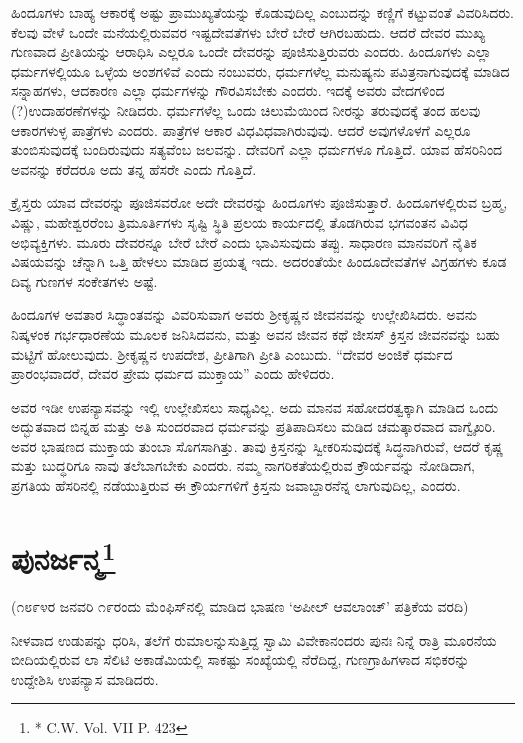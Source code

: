 ಹಿಂದೂಗಳು ಬಾಹ್ಯ ಆಕಾರಕ್ಕೆ ಅಷ್ಟು ಪ್ರಾಮುಖ್ಯತೆಯನ್ನು ಕೊಡುವುದಿಲ್ಲ ಎಂಬುದನ್ನು ಕಣ್ಣಿಗೆ ಕಟ್ಟುವಂತೆ ವಿವರಿಸಿದರು. ಕೆಲವು ವೇಳೆ ಒಂದೇ ಮನೆಯಲ್ಲಿರುವವರ ಇಷ್ಟದೇವತೆಗಳು ಬೇರೆ ಬೇರೆ ಆಗಿರಬಹುದು. ಆದರೆ ದೇವರ ಮುಖ್ಯ ಗುಣವಾದ ಪ್ರೀತಿಯನ್ನು ಆರಾಧಿಸಿ ಎಲ್ಲರೂ ಒಂದೇ ದೇವರನ್ನು ಪೂಜಿಸುತ್ತಿರುವರು ಎಂದರು. ಹಿಂದೂಗಳು ಎಲ್ಲಾ ಧರ್ಮಗಳಲ್ಲಿಯೂ ಒಳ್ಳೆಯ ಅಂಶಗಳಿವೆ ಎಂದು ನಂಬುವರು, ಧರ್ಮಗಳೆಲ್ಲ ಮನುಷ್ಯನು ಪವಿತ್ರನಾಗುವುದಕ್ಕೆ ಮಾಡಿದ ಸನ್ನಾಹಗಳು, ಆದಕಾರಣ ಎಲ್ಲಾ ಧರ್ಮಗಳನ್ನು ಗೌರವಿಸಬೇಕು ಎಂದರು. ಇದಕ್ಕೆ ಅವರು ವೇದಗಳಿಂದ (?)ಉದಾಹರಣೆಗಳನ್ನು ನೀಡಿದರು. ಧರ್ಮಗಳೆಲ್ಲ ಒಂದು ಚಿಲುಮೆಯಿಂದ ನೀರನ್ನು ತರುವುದಕ್ಕೆ ತಂದ ಹಲವು ಆಕಾರಗಳುಳ್ಳ ಪಾತ್ರೆಗಳು ಎಂದರು. ಪಾತ್ರೆಗಳ ಆಕಾರ ವಿಧವಿಧವಾಗಿರುವುವು. ಆದರೆ ಅವುಗಳೊಳಗೆ ಎಲ್ಲರೂ ತುಂಬಿಸುವುದಕ್ಕೆ ಬಂದಿರುವುದು ಸತ್ಯವೆಂಬ ಜಲವನ್ನು. ದೇವರಿಗೆ ಎಲ್ಲಾ ಧರ್ಮಗಳೂ ಗೊತ್ತಿದೆ. ಯಾವ ಹೆಸರಿನಿಂದ ಅವನನ್ನು ಕರೆದರೂ ಅದು ತನ್ನ ಹೆಸರೇ ಎಂದು ಗೊತ್ತಿದೆ.

ಕ್ರೈಸ್ತರು ಯಾವ ದೇವರನ್ನು ಪೂಜಿಸವರೋ ಅದೇ ದೇವರನ್ನು ಹಿಂದೂಗಳು ಪೂಜಿಸುತ್ತಾರೆ. ಹಿಂದೂಗಳಲ್ಲಿರುವ ಬ್ರಹ್ಮ, ವಿಷ್ಣು, ಮಹೇಶ್ವರರೆಂಬ ತ್ರಿಮೂರ್ತಿಗಳು ಸೃಷ್ಟಿ ಸ್ಥಿತಿ ಪ್ರಲಯ ಕಾರ್ಯದಲ್ಲಿ ತೊಡಗಿರುವ ಭಗವಂತನ ವಿವಿಧ ಅಭಿವ್ಯಕ್ತಿಗಳು. ಮೂರು ದೇವರನ್ನೂ ಬೇರೆ ಬೇರೆ ಎಂದು ಭಾವಿಸುವುದು ತಪ್ಪು. ಸಾಧಾರಣ ಮಾನವರಿಗೆ ನೈತಿಕ ವಿಷಯವನ್ನು ಚೆನ್ನಾಗಿ ಒತ್ತಿ ಹೇಳಲು ಮಾಡಿದ ಪ್ರಯತ್ನ ಇದು. ಅದರಂತೆಯೇ ಹಿಂದೂದೇವತೆಗಳ ವಿಗ್ರಹಗಳು ಕೂಡ ದಿವ್ಯ ಗುಣಗಳ ಸಂಕೇತಗಳು ಅಷ್ಟೆ.

ಹಿಂದೂಗಳ ಅವತಾರ ಸಿದ್ಧಾಂತವನ್ನು ವಿವರಿಸುವಾಗ ಅವರು ಶ‍್ರೀಕೃಷ್ಣನ ಜೀವನವನ್ನು ಉಲ್ಲೇಖಿಸಿದರು. ಅವನು ನಿಷ್ಕಳಂಕ ಗರ್ಭಧಾರಣೆಯ ಮೂಲಕ ಜನಿಸಿದವನು, ಮತ್ತು ಅವನ ಜೀವನ ಕಥೆ ಜೀಸಸ್​ ಕ್ರಿಸ್ತನ ಜೀವನವನ್ನು ಬಹು ಮಟ್ಟಿಗೆ ಹೋಲುವುದು. ಶ‍್ರೀಕೃಷ್ಣನ ಉಪದೇಶ, ಪ್ರೀತಿಗಾಗಿ ಪ್ರೀತಿ ಎಂಬುದು. “ದೇವರ ಅಂಜಿಕೆ ಧರ್ಮದ ಪ್ರಾರಂಭವಾದರೆ, ದೇವರ ಪ್ರೇಮ ಧರ್ಮದ ಮುಕ್ತಾಯ” ಎಂದು ಹೇಳಿದರು.

ಅವರ ಇಡೀ ಉಪನ್ಯಾಸವನ್ನು ಇಲ್ಲಿ ಉಲ್ಲೇಖಿಸಲು ಸಾಧ್ಯವಿಲ್ಲ. ಅದು ಮಾನವ ಸಹೋದರತ್ವಕ್ಕಾಗಿ ಮಾಡಿದ ಒಂದು ಅದ್ಭುತವಾದ ಬಿನ್ನಹ ಮತ್ತು ಅತಿ ಸುಂದರವಾದ ಧರ್ಮವನ್ನು ಪ್ರತಿಪಾದಿಸಲು ಮಡಿದ ಚಮತ್ಕಾರವಾದ ವಾಗ್ವೈಖರಿ. ಅವರ ಭಾಷಣದ ಮುಕ್ತಾಯ ತುಂಬಾ ಸೊಗಸಾಗಿತ್ತು. ತಾವು ಕ್ರಿಸ್ತನನ್ನು ಸ್ವೀಕರಿಸುವುದಕ್ಕೆ ಸಿದ್ಧನಾಗಿರುವೆ, ಆದರೆ ಕೃಷ್ಣ ಮತ್ತು ಬುದ್ಧರಿಗೂ ನಾವು ತಲೆಬಾಗಬೇಕು ಎಂದರು. ನಮ್ಮ ನಾಗರಿಕತೆಯಲ್ಲಿರುವ ಕ್ರೌರ್ಯವನ್ನು ನೋಡಿದಾಗ, ಪ್ರಗತಿಯ ಹೆಸರಿನಲ್ಲಿ ನಡೆಯುತ್ತಿರುವ ಈ ಕ್ರೌರ್ಯಗಳಿಗೆ ಕ್ರಿಸ್ತನು ಜವಾಬ್ದಾರನೆನ್ನ ಲಾಗುವುದಿಲ್ಲ, ಎಂದರು.


\section[ಪುನರ್ಜನ್ಮ]{ಪುನರ್ಜನ್ಮ\protect\footnote{* C.W. Vol. VII P. 423}}

\begin{center}
(೧೮೯೪ರ ಜನವರಿ ೧೯ರಂದು ಮೆಂಫಿಸ್​ನಲ್ಲಿ ಮಾಡಿದ ಭಾಷಣ ‘ಅಪೀಲ್​ ಆವಲಾಂಚ್​’ ಪತ್ರಿಕೆಯ ವರದಿ)
\end{center}

ನೀಳವಾದ ಉಡುಪನ್ನು ಧರಿಸಿ, ತಲೆಗೆ ರುಮಾಲನ್ನುಸುತ್ತಿದ್ದ ಸ್ವಾಮಿ ವಿವೇಕಾನಂದರು ಪುನಃ ನಿನ್ನೆ ರಾತ್ರಿ ಮೂರನೆಯ ಬೀದಿಯಲ್ಲಿರುವ ಲಾ ಸೆಲಿಟಿ ಅಕಾಡೆಮಿಯಲ್ಲಿ ಸಾಕಷ್ಟು ಸಂಖ್ಯೆಯಲ್ಲಿ ನೆರೆದಿದ್ದ, ಗುಣಗ್ರಾಹಿಗಳಾದ ಸಭಿಕರನ್ನು ಉದ್ದೇಶಿಸಿ ಉಪನ್ಯಾಸ ಮಾಡಿದರು.

